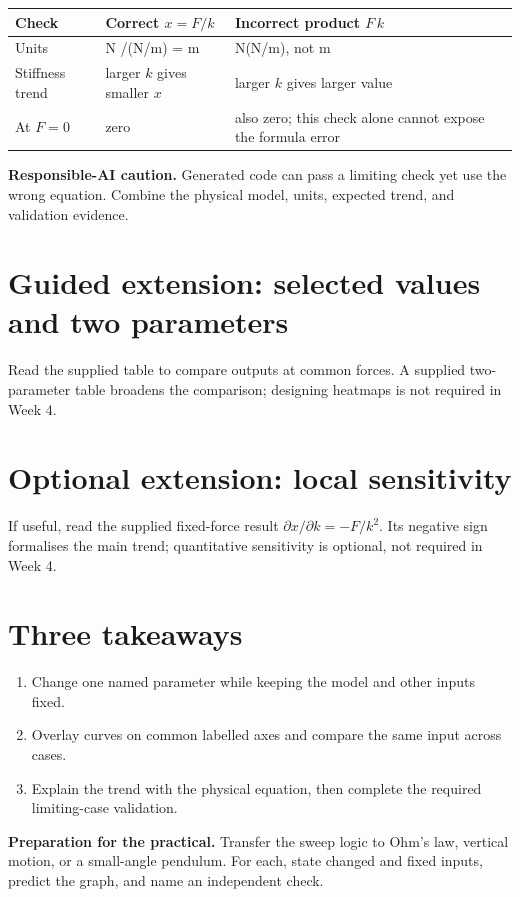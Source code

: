 \documentclass[11pt,a4paper]{article}
\begin{document}
\begin{center}\small
\begin{tabular}{>{\raggedright\arraybackslash}p{.27\linewidth}>{\raggedright\arraybackslash}p{.30\linewidth}>{\raggedright\arraybackslash}p{.29\linewidth}}
\toprule
\textbf{Check} & \textbf{Correct $x=F/k$} & \textbf{Incorrect product $F\,k$}\\
\midrule
Units & N /(N/m) = m & N(N/m), not m\\
Stiffness trend & larger $k$ gives smaller $x$ & larger $k$ gives larger value\\
At $F=0$ & zero & also zero; this check alone cannot expose the formula error\\
\bottomrule
\end{tabular}
\end{center}

\begin{aibox}\textbf{Responsible-AI caution.} Generated code can pass a limiting check yet use the wrong equation. Combine the physical model, units, expected trend, and validation evidence.\end{aibox}

\section*{Guided extension: selected values and two parameters}
Read the supplied table to compare outputs at common forces. A supplied two-parameter table broadens the comparison; designing heatmaps is not required in Week 4.

\section*{Optional extension: local sensitivity}
If useful, read the supplied fixed-force result $\partial x/\partial k=-F/k^2$. Its negative sign formalises the main trend; quantitative sensitivity is optional, not required in Week 4.

\section*{Three takeaways}
\begin{enumerate}[nosep,leftmargin=6mm]
\item Change one named parameter while keeping the model and other inputs fixed.
\item Overlay curves on common labelled axes and compare the same input across cases.
\item Explain the trend with the physical equation, then complete the required limiting-case validation.
\end{enumerate}

\begin{keybox}\textbf{Preparation for the practical.} Transfer the sweep logic to Ohm's law, vertical motion, or a small-angle pendulum. For each, state changed and fixed inputs, predict the graph, and name an independent check.\end{keybox}
\end{document}
